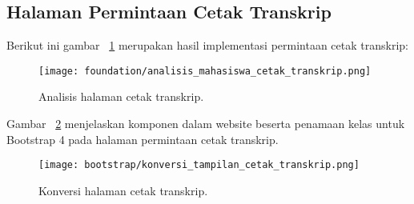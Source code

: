 \subsection{Halaman Permintaan Cetak Transkrip }
Berikut ini gambar ~\ref{fig:analisisCetakTranskrip} merupakan hasil implementasi permintaan cetak transkrip:
\begin{figure} [H]
	\centering  
	\texttt{[image: foundation/analisis\_mahasiswa\_cetak\_transkrip.png]}
	\caption{Analisis halaman cetak transkrip.} 
	\label{fig:analisisCetakTranskrip}
\end{figure} 

\noindent Gambar ~\ref{fig:konversiPermintaanCetakTranskrip} menjelaskan komponen dalam website beserta penamaan kelas untuk Bootstrap 4 pada halaman permintaan cetak transkrip.\\

\begin{figure} [H]
	\centering  
	\texttt{[image: bootstrap/konversi\_tampilan\_cetak\_transkrip.png]}
	\caption{Konversi halaman cetak transkrip.} 
	\label{fig:konversiPermintaanCetakTranskrip}
\end{figure}

